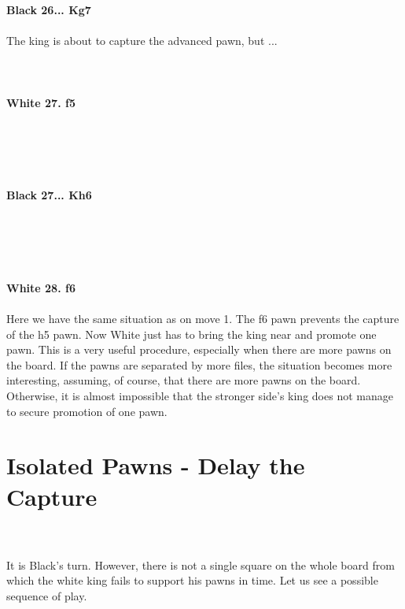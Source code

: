 \documentclass{article}
\begin{document}

\\
\\
\textbf{Black 26... Kg7}\\
\\
The king is about to capture the advanced pawn, but ...\\
\\

\\
\\
\textbf{White 27. f5}\\
\\
\\
\\

\\
\\
\textbf{Black 27... Kh6}\\
\\
\\
\\

\\
\\
\textbf{White 28. f6}\\
\\
Here we have the same situation as on move 1. The f6 pawn prevents the capture of the h5 pawn. Now White just has to bring the king near and promote one pawn. This is a very useful procedure, especially when there are more pawns on the board. If the pawns are separated by more files, the situation becomes more interesting, assuming, of course, that there are more pawns on the board. Otherwise, it is almost impossible that the stronger side's king does not manage to secure promotion of one pawn.\section{ Isolated Pawns - Delay the Capture}

\\
\\
It is Black's turn. However, there is not a single square on the whole board from which the white king fails to support his pawns in time. Let us see a possible sequence of play.\\
\\
\end{document}
